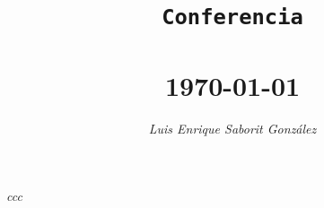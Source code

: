 \documentclass[a4paper, 10pt]{article}
\title{\vspace{30ex}\Large{ \texttt{Conferencia} \\ \textbf{} \\ \today}}
\author{\textit{Luis Enrique Saborit Gonz\'alez}}
\date{}
\numberwithin{theoremCounter}{subsection}
\numberwithin{problemCounter}{subsection}
\numberwithin{defCounter}{subsection}
\numberwithin{obsCounter}{subsection}
\numberwithin{methCounter}{subsection}
\numberwithin{exampleCounter}{subsection}
\numberwithin{propCounter}{subsection}
\theoremstyle{violetnumbox}
\theoremstyle{blacknumex}
\begin{document}


\maketitle

\vspace*{\fill}


\begin{flushright}
    \textit{
       ccc    
    }

\vspace{3cm}

\end{flushright}

\newpage

\begin{multicols}{2}



\tableofcontents
\newpage
\pagestyle{fancy}



\end{multicols}
\end{document}
